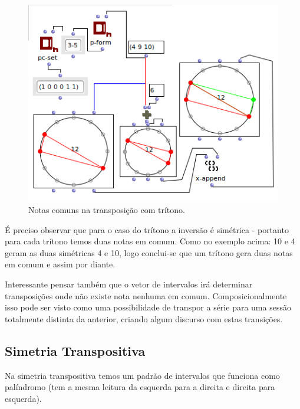 \documentclass[
	12pt,				%
	openright,			%
	twoside,			%
	a4paper,			%
	english,			%
	french,				%
	spanish,			%
	brazil				%
	]{abntex2}
\begin{document}
\begin{apendicesenv}
\begin{figure}[!h]
	\caption{\label{fig_grafico}Notas comuns na transposição com trítono. }
	\begin{center}
	    \includegraphics[scale=0.7]{OM_settheory/notas_comuns_tritono.png}
	\end{center}
\end{figure}

É preciso observar que para o caso do trítono a inversão é simétrica - portanto para cada trítono temos duas notas em comum. Como no exemplo acima: 10 e 4 geram as duas simétricas 4 e 10, logo conclui-se que um trítono gera duas notas em comum e assim por diante.

Interessante pensar também que o vetor de intervalos irá determinar transposições onde não existe nota nenhuma em comum. Composicionalmente isso pode ser visto como uma possibilidade de transpor a série para uma sessão totalmente distinta da anterior, criando algum discurso com estas transições.


\subsection{Simetria Transpositiva}

Na simetria transpositiva temos um padrão de intervalos que funciona como palíndromo (tem a mesma leitura da esquerda para a direita e direita para esquerda).


\end{apendicesenv}
\end{document}
